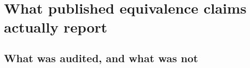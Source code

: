 %

\section{What published equivalence claims actually report}

\label{sec:audit}

\subsection{What was audited, and what was not}

